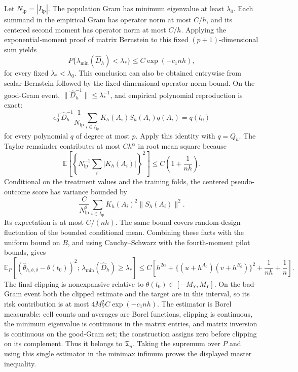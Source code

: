 Let \(N_{\mathrm{lp}}=|I_{\mathrm{lp}}|\). The population Gram has minimum eigenvalue at least \(\lambda_0\). Each summand in the empirical Gram has operator norm at most \(C/h\), and its centered second moment has operator norm at most \(C/h\). Applying the exponential-moment proof of matrix Bernstein to this fixed \((p+1)\)-dimensional sum yields
\[
P\{\lambda_{\min}(\widehat D_h)<\lambda_*\}\le C\exp(-c_1nh),
\]
for every fixed \(\lambda_*<\lambda_0\). This conclusion can also be obtained entrywise from scalar Bernstein followed by the fixed-dimensional operator-norm bound. On the good-Gram event, \(\|\widehat D_h^{-1}\|\le\lambda_*^{-1}\), and empirical polynomial reproduction is exact:
\[
e_0^\top\widehat D_h^{-1}\frac1{N_{\mathrm{lp}}}\sum_{i\in I_{\mathrm{lp}}}K_h(A_i)S_h(A_i)q(A_i)=q(t_0)
\]
for every polynomial \(q\) of degree at most \(p\). Apply this identity with \(q=Q_h\). The Taylor remainder contributes at most \(Ch^\alpha\) in root mean square because
\[
\mathbb E\left[\left\{N_{\mathrm{lp}}^{-1}\sum_i|K_h(A_i)|\right\}^2\right]\le C\left(1+\frac1{nh}\right).
\]
Conditional on the treatment values and the training folds, the centered pseudo-outcome score has variance bounded by
\[
\frac{C}{N_{\mathrm{lp}}^2}\sum_{i\in I_{\mathrm{lp}}}K_h(A_i)^2\|S_h(A_i)\|^2.
\]
Its expectation is at most \(C/(nh)\). The same bound covers random-design fluctuation of the bounded conditional mean. Combining these facts with the uniform bound on \(B\), and using Cauchy--Schwarz with the fourth-moment pilot bounds, gives
\[
\mathbb E_P[(\widehat\theta_{h,b,\delta}-\theta(t_0))^2;\,\lambda_{\min}(\widehat D_h)\ge\lambda_*]
\le C\left[h^{2\alpha}+\{(u+h^{A_0})(v+h^{B_0})\}^2+\frac1{nh}+\frac1n\right].
\]
The final clipping is nonexpansive relative to \(\theta(t_0)\in[-M_Y,M_Y]\). On the bad-Gram event both the clipped estimate and the target are in this interval, so its risk contribution is at most \(4M_Y^2C\exp(-c_1nh)\). The estimator is Borel measurable: cell counts and averages are Borel functions, clipping is continuous, the minimum eigenvalue is continuous in the matrix entries, and matrix inversion is continuous on the good-Gram set; the construction assigns zero before clipping on its complement. Thus it belongs to \(\mathfrak T_n\). Taking the supremum over \(P\) and using this single estimator in the minimax infimum proves the displayed master inequality.